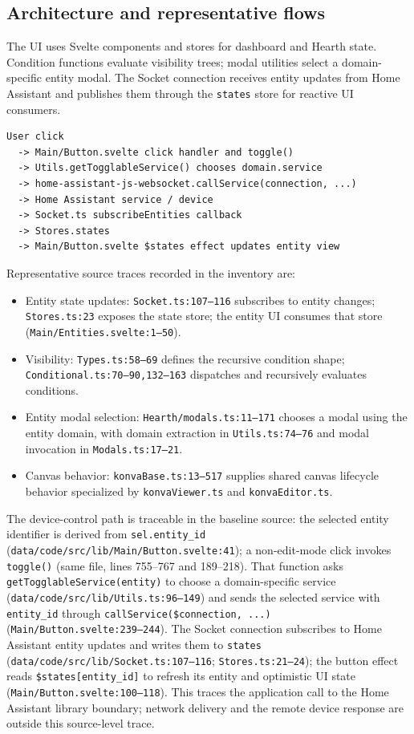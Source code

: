 \documentclass[11pt,a4paper]{article}
\newcommand{\code}[1]{\texttt{\small #1}}
\begin{document}
\subsection{Architecture and representative flows}
The UI uses Svelte components and stores for dashboard and Hearth state.
Condition functions evaluate visibility trees; modal utilities select a
domain-specific entity modal. The Socket connection receives entity updates
from Home Assistant and publishes them through the \code{states} store for
reactive UI consumers.

\begin{lstlisting}[basicstyle=\ttfamily\small,frame=single]
User click
  -> Main/Button.svelte click handler and toggle()
  -> Utils.getTogglableService() chooses domain.service
  -> home-assistant-js-websocket.callService(connection, ...)
  -> Home Assistant service / device
  -> Socket.ts subscribeEntities callback
  -> Stores.states
  -> Main/Button.svelte $states effect updates entity view
\end{lstlisting}

Representative source traces recorded in the inventory are:
\begin{itemize}[nosep]
  \item Entity state updates: \code{Socket.ts:107--116} subscribes to entity
  changes; \code{Stores.ts:23} exposes the state store; the entity UI consumes
  that store (\code{Main/Entities.svelte:1--50}).
  \item Visibility: \code{Types.ts:58--69} defines the recursive condition
  shape; \code{Conditional.ts:70--90,132--163} dispatches and recursively
  evaluates conditions.
  \item Entity modal selection: \code{Hearth/modals.ts:11--171} chooses a
  modal using the entity domain, with domain extraction in \code{Utils.ts:74--76}
  and modal invocation in \code{Modals.ts:17--21}.
  \item Canvas behavior: \code{konvaBase.ts:13--517} supplies shared canvas
  lifecycle behavior specialized by \code{konvaViewer.ts} and
  \code{konvaEditor.ts}.
\end{itemize}

The device-control path is traceable in the baseline source: the selected
entity identifier is derived from \code{sel.entity\_id}
(\code{data/code/src/lib/Main/Button.svelte:41}); a non-edit-mode click invokes
\code{toggle()} (same file, lines 755--767 and 189--218). That function asks
\code{getTogglableService(entity)} to choose a domain-specific service
(\code{data/code/src/lib/Utils.ts:96--149}) and sends the selected service
with \code{entity\_id} through \code{callService(\$connection, ...)}
(\code{Main/Button.svelte:239--244}). The Socket connection subscribes to
Home Assistant entity updates and writes them to \code{states}
(\code{data/code/src/lib/Socket.ts:107--116}; \code{Stores.ts:21--24}); the
button effect reads \code{\$states[entity\_id]} to refresh its entity and
optimistic UI state (\code{Main/Button.svelte:100--118}). This traces the
application call to the Home Assistant library boundary; network delivery and
the remote device response are outside this source-level trace.
\end{document}
